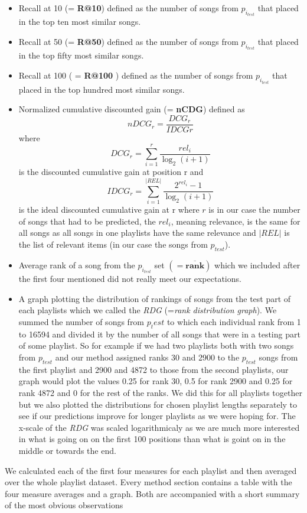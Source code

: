 \begin{itemize}
    \item Recall at 10 (= \textbf{R@10}) defined as the number of songs from $p_{i_{test}} $ that placed in the top ten most similar songs.
    \item Recall at 50 (= \textbf{R@50}) defined as the number of songs from $p_{i_{test}} $ that placed in the top fifty most similar songs.
    \item Recall at 100 ( = \textbf{R@100} ) defined as the number of songs from $p_{i_{test}} $ that placed in the top hundred most similar songs.
    \item Normalized cumulative discounted gain (= \textbf{nCDG}) defined as 
    $${nDCG_{r}} = \frac{DCG_{r}}{IDCG{r}} $$
    where 
    $${DCG_{r}} =\sum_{i=1}^{r}{\frac {rel_{i}}{\log _{2}(i+1)}} $$ 
    is the discounted cumulative gain at position r and 
    $$ {IDCG_{r}} =\sum _{i=1}^{|REL|}{\frac {2^{rel_{i}}-1}{\log _{2}(i+1)}} $$
    is the ideal discounted cumulative gain at r
    where $r$ is in our case the number of songs that had to be predicted, the $rel_i$, meaning relevance, is the same for all songs as all songs in one playlists have the same relevance and $|REL|$ is the list of relevant items (in our case the songs from $p_{test}$).
    \item Average rank of a song from the $p_{i_{test}}$ set $ \boldsymbol{ (= \overline{rank})} $ which we included after the first four mentioned did not really meet our expectations.
    \item A graph plotting the distribution of rankings of songs from the test part of each playlists which we called the \textit{RDG} (=\textit{rank distribution graph}). We summed the number of songs from $p_test$ to which each individual rank from 1 to 16594 and divided it by the number of all songs that were in a testing part of some playlist. So for example if we had two playlists both with two songs from $p_{test}$ and our method assigned ranks 30 and 2900 to the $p_{test}$ songs from the first playlist and 2900 and 4872 to those from the second playlists, our graph would plot the values 0.25 for rank 30, 0.5 for rank 2900 and 0.25 for rank 4872 and 0 for the rest of the ranks. We did this for all playlists together but we also plotted the distributions for chosen playlist lengths separately to see if our predictions improve for longer playlists as we were hoping for. The x-scale of the \textit{RDG} was scaled logarithmicaly as we are much more interested in what is going on on the first 100 positions than what is goint on in the middle or towards the end. 
    
\end{itemize}
We calculated each of the first four measures for each playlist and then averaged over the whole playlist dataset. Every method section contains a table with the four measure averages and a graph. Both are accompanied with a short summary of the most obvious observations

